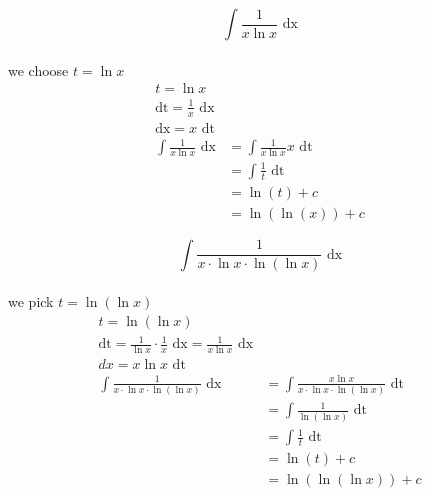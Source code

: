 \documentclass[a4paper,12pt]{article}
\newcommand{\?}{\stackrel{?}{=}}
\begin{document}
\begin{definition}
\begin{my_example}
\[
  \int \frac{1}{x\ln{x}} \text{ dx}
\]\\[0pt]
we choose \(t = \ln{x}\)\\[0pt]
\begin{align*}
  t = \ln{x}\\
  \text{dt} = \frac1x \text{ dx}\\
  \text{dx} = x \text{ dt}\\
  \int \frac{1}{x\ln{x}} \text{ dx} &= \int \frac{1}{x\ln{x}} x \text{ dt}\\
  &= \int \frac{1}{t} \text{ dt}\\
  &= \ln(t) + c\\
  &= \ln(\ln(x)) + c
\end{align*}
\end{my_example}

\begin{my_example}
\[
  \int \frac{1}{x \cdot \ln{x} \cdot \ln(\ln{x})} \text{ dx}
\]\\[0pt]
we pick \(t = \ln(\ln{x})\)\\[0pt]
\begin{align*}
  t = \ln(\ln{x})\\
  \text{dt} = \frac{1}{\ln{x}} \cdot \frac1x \text{ dx} = \frac{1}{x\ln{x}} \text{ dx}\\
  dx = x\ln{x} \text{ dt}\\
  \int \frac{1}{x \cdot \ln{x} \cdot \ln(\ln{x})} \text{ dx} &= \int \frac{x\ln{x}}{x \cdot \ln{x} \cdot \ln(\ln{x})} \text{ dt}\\
  &= \int \frac{1}{\ln(\ln{x})} \text{ dt}\\
  &= \int \frac{1}{t} \text{ dt}\\
  &= \ln(t) + c\\
  &= \ln(\ln(\ln{x})) + c\\
\end{align*}
\end{my_example}


\end{definition}
\end{document}
